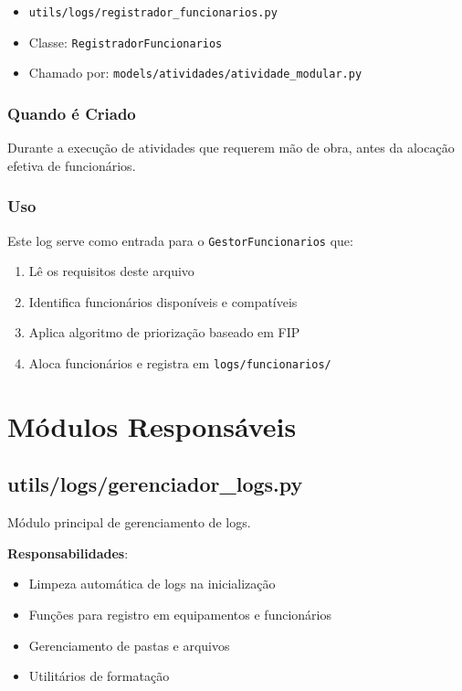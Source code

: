 \documentclass[11pt,a4paper]{article}
\begin{document}
\begin{itemize}
    \item \texttt{utils/logs/registrador\_funcionarios.py}
    \item Classe: \texttt{RegistradorFuncionarios}
    \item Chamado por: \texttt{models/atividades/atividade\_modular.py}
\end{itemize}

\subsubsection{Quando é Criado}

Durante a execução de atividades que requerem mão de obra, antes da alocação efetiva de funcionários.

\subsubsection{Uso}

Este log serve como entrada para o \texttt{GestorFuncionarios} que:
\begin{enumerate}
    \item Lê os requisitos deste arquivo
    \item Identifica funcionários disponíveis e compatíveis
    \item Aplica algoritmo de priorização baseado em FIP
    \item Aloca funcionários e registra em \texttt{logs/funcionarios/}
\end{enumerate}

\newpage

\section{Módulos Responsáveis}

\subsection{utils/logs/gerenciador\_logs.py}

Módulo principal de gerenciamento de logs.

\textbf{Responsabilidades}:
\begin{itemize}
    \item Limpeza automática de logs na inicialização
    \item Funções para registro em equipamentos e funcionários
    \item Gerenciamento de pastas e arquivos
    \item Utilitários de formatação
\end{itemize}
\end{document}

